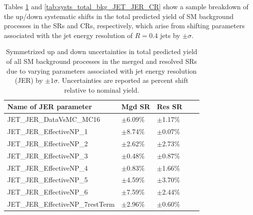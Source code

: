 Tables \ref{tab:systs_total_bkg_JET_JER_SR} and \ref{tab:systs_total_bkg_JET_JER_CR} show a sample breakdown of the up/down systematic shifts in the total predicted yield of SM background processes in the SRs and CRs, respectively, which arise from shifting parameters associated with the jet energy resolution of \(R=0.4\) jets by \(\pm\sigma\). 

\begin{table}[ht]
\caption{\label{tab:systs_total_bkg_JET_JER_SR} Symmetrized up and down uncertainties in total predicted yield of all SM background processes in the merged and resolved SRs due to varying parameters associated with jet energy resolution (JER) by \(\pm1\sigma\). Uncertainties are reported as percent shift relative to nominal yield.}
\footnotesize{
\begin{tabular}{l l l l l }
\toprule
\textbf{Name of JER parameter} & \textbf{Mgd SR} & \textbf{Res SR}\tabularnewline
\midrule
\midrule
JET\_JER\_DataVsMC\_MC16 & \(\pm\)6.09\% &\(\pm\)1.17\% \tabularnewline
\midrule
JET\_JER\_EffectiveNP\_1 & \(\pm\)8.74\% &\(\pm\)0.07\% \tabularnewline
\midrule
JET\_JER\_EffectiveNP\_2 & \(\pm\)2.62\% &\(\pm\)2.73\% \tabularnewline
\midrule
JET\_JER\_EffectiveNP\_3 & \(\pm\)0.48\% &\(\pm\)0.87\% \tabularnewline
\midrule
JET\_JER\_EffectiveNP\_4 & \(\pm\)0.83\% &\(\pm\)1.66\% \tabularnewline
\midrule
JET\_JER\_EffectiveNP\_5 & \(\pm\)4.59\% &\(\pm\)3.70\% \tabularnewline
\midrule
JET\_JER\_EffectiveNP\_6 & \(\pm\)7.59\% &\(\pm\)2.44\% \tabularnewline
\midrule
JET\_JER\_EffectiveNP\_7restTerm & \(\pm\)2.96\% &\(\pm\)0.60\% \tabularnewline
\bottomrule
\end{tabular}}
\end{table}

